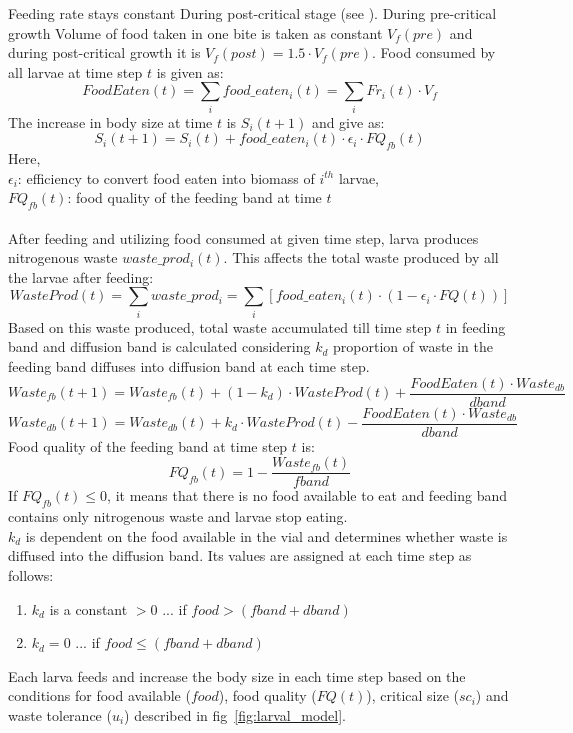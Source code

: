\noindent Feeding rate stays constant During post-critical stage (see \cite{santosDensityDependentNaturalSelection1997}). During pre-critical growth Volume of food taken in one bite is taken as constant $V_{f}(pre)$ and during post-critical growth it is $V_{f}(post) = 1.5\cdot V_{f}(pre)$. Food consumed by all larvae at time step $t$ is given as:
\[FoodEaten(t) = \sum_{i}food\_eaten_{i}(t) = \sum_{i}Fr_{i}(t)\cdot V_{f}\]
The increase in body size at time $t$ is $S_{i}(t+1)$ and give as:
\[S_{i}(t+1) = S_{i}(t) + food\_eaten_{i}(t)\cdot \epsilon_{i}\cdot FQ_{fb}(t)\]
Here,\\
$\epsilon_{i}$: efficiency to convert food eaten into biomass of $i^{th}$ larvae,\\
$FQ_{fb}(t)$: food quality of the feeding band at time $t$\\ \\
After feeding and utilizing food consumed at given time step, larva produces nitrogenous waste $waste\_prod_{i}(t)$. This affects the total waste produced by all the larvae after feeding:
\[WasteProd(t) = \sum_{i}waste\_prod_{i} = \sum_{i}[food\_eaten_{i}(t)\cdot (1-\epsilon_{i}\cdot FQ(t))]\]
Based on this waste produced, total waste accumulated till time step $t$ in feeding band and diffusion band is calculated considering $k_{d}$ proportion of waste in the feeding band diffuses into diffusion band at each time step.
\[Waste_{fb}(t+1) = Waste_{fb}(t) + (1-k_{d})\cdot WasteProd(t) + \frac{FoodEaten(t)\cdot Waste_{db}}{dband}\]
\[Waste_{db}(t+1) = Waste_{db}(t) + k_{d}\cdot WasteProd(t) - \frac{FoodEaten(t)\cdot Waste_{db}}{dband}\]
Food quality of the feeding band at time step $t$ is:
\[FQ_{fb}(t) = 1 - \frac{Waste_{fb}(t)}{fband}\]
If $FQ_{fb}(t) \leq 0 $, it means that there is no food available to eat and feeding band contains only nitrogenous waste and larvae stop eating.\\
$k_{d}$ is dependent on the food available in the vial and determines whether waste is diffused into the diffusion band. Its values are assigned at each time step as follows:
\begin{enumerate}[i]
  \item $k_{d}$ is a constant $> 0$ ... if $food > (fband+dband)$
  \item $k_{d} = 0$ ... if $food \leq (fband+dband)$
\end{enumerate}
Each larva feeds and increase the body size in each time step based on the conditions for food available ($food$), food quality ($FQ(t)$), critical size ($sc_{i}$) and waste tolerance ($u_{i}$) described in fig~\ref{fig:larval_model}.\\

